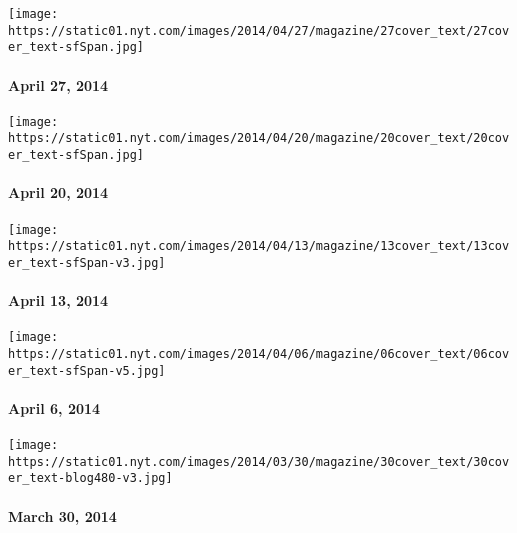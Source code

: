\href{http://www.nytimes.com/indexes/2014/04/27/magazine/index.html}{}

\texttt{[image: https://static01.nyt.com/images/2014/04/27/magazine/27cover\_text/27cover\_text-sfSpan.jpg]}

\hypertarget{april-27-2014}{%
\paragraph{April 27, 2014}\label{april-27-2014}}

\href{http://www.nytimes.com/indexes/2014/04/20/magazine/index.html}{}

\texttt{[image: https://static01.nyt.com/images/2014/04/20/magazine/20cover\_text/20cover\_text-sfSpan.jpg]}

\hypertarget{april-20-2014}{%
\paragraph{April 20, 2014}\label{april-20-2014}}

\href{http://www.nytimes.com/indexes/2014/04/13/magazine/index.html}{}

\texttt{[image: https://static01.nyt.com/images/2014/04/13/magazine/13cover\_text/13cover\_text-sfSpan-v3.jpg]}

\hypertarget{april-13-2014}{%
\paragraph{April 13, 2014}\label{april-13-2014}}

\href{http://www.nytimes.com/indexes/2014/04/06/magazine/index.html}{}

\texttt{[image: https://static01.nyt.com/images/2014/04/06/magazine/06cover\_text/06cover\_text-sfSpan-v5.jpg]}

\hypertarget{april-6-2014}{%
\paragraph{April 6, 2014}\label{april-6-2014}}

\href{http://www.nytimes.com/indexes/2014/03/30/magazine/index.html}{}

\texttt{[image: https://static01.nyt.com/images/2014/03/30/magazine/30cover\_text/30cover\_text-blog480-v3.jpg]}

\hypertarget{march-30-2014}{%
\paragraph{March 30, 2014}\label{march-30-2014}}

